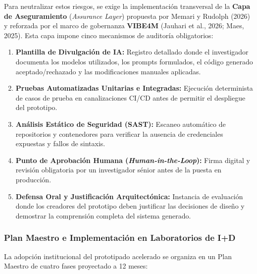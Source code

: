 Para neutralizar estos riesgos, se exige la implementación transversal de la \textbf{Capa de Aseguramiento} (\textit{Assurance Layer}) propuesta por Memari y Rudolph (2026) y reforzada por el marco de gobernanza \textbf{VIBE4M} (Jauhari et al., 2026; Maes, 2025). Esta capa impone cinco mecanismos de auditoría obligatorios:

\begin{enumerate}
    \item \textbf{Plantilla de Divulgación de IA:} Registro detallado donde el investigador documenta los modelos utilizados, los prompts formulados, el código generado aceptado/rechazado y las modificaciones manuales aplicadas.
    \item \textbf{Pruebas Automatizadas Unitarias e Integradas:} Ejecución determinista de casos de prueba en canalizaciones CI/CD antes de permitir el despliegue del prototipo.
    \item \textbf{Análisis Estático de Seguridad (SAST):} Escaneo automático de repositorios y contenedores para verificar la ausencia de credenciales expuestas y fallos de sintaxis.
    \item \textbf{Punto de Aprobación Humana (\textit{Human-in-the-Loop}):} Firma digital y revisión obligatoria por un investigador sénior antes de la puesta en producción.
    \item \textbf{Defensa Oral y Justificación Arquitectónica:} Instancia de evaluación donde los creadores del prototipo deben justificar las decisiones de diseño y demostrar la comprensión completa del sistema generado.
\end{enumerate}

\subsubsection{Plan Maestro e Implementación en Laboratorios de I+D}

La adopción institucional del prototipado acelerado se organiza en un Plan Maestro de cuatro fases proyectado a 12 meses:

